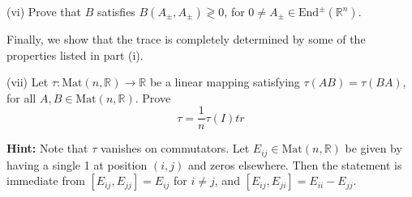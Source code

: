 \begin{exercise}{1}
    (vi) Prove that $B$ satisfies $B(A_{\pm}, A_{\pm}) \gtrless 0$, for $0 \neq A_{\pm} \in \text{End}^{\pm}(\mathbb{R}^n)$.

    Finally, we show that the trace is completely determined by some of the properties listed in part (i).

    (vii) Let $\tau : \text{Mat}(n, \mathbb{R}) \rightarrow \mathbb{R}$ be a linear mapping satisfying $\tau(AB) = \tau(BA)$, for all $A, B \in \text{Mat}(n, \mathbb{R})$. Prove
    $$\tau = \frac{1}{n}\tau(I)tr$$

    \textbf{Hint:} Note that $\tau$ vanishes on commutators. Let $E_{ij} \in \text{Mat}(n, \mathbb{R})$ be given by having a single 1 at position $(i, j)$ and zeros elsewhere. Then the statement is immediate from $[E_{ij}, E_{jj}] = E_{ij}$ for $i \neq j$, and $[E_{ij}, E_{ji}] = E_{ii} - E_{jj}$.
    
\end{exercise}

